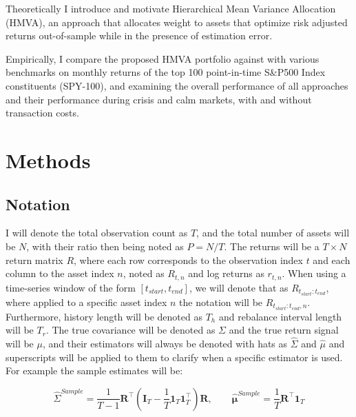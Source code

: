 \documentclass[12pt]{article}
\begin{document}
Theoretically I introduce and motivate Hierarchical Mean Variance Allocation (HMVA), an approach that allocates weight to assets that optimize risk adjusted returns out-of-sample while in the presence of estimation error.

Empirically, I compare the proposed HMVA portfolio against with various benchmarks on monthly returns of the top 100 point-in-time S\&P500 Index constituents (SPY-100), and examining the overall performance of all approaches and their performance during crisis and calm markets, with and without transaction costs.

\section{Methods}
\label{sec:meth}
\subsection{Notation}
I will denote the total observation count as $T$, and the total number of assets will be $N$, with their ratio then being noted as $P=N/T$. The returns will be a $T \times N$ return matrix $R$, where each row corresponds to the observation index $t$ and each column to the asset index $n$, noted as $R_{t,n}$ and log returns as $r_{t,n}$. When using a time-series window of the form $[t_{start}, t_{end}]$, we will denote that as $R_{t_{start}:t_{end}}$, where applied to a specific asset index $n$ the notation will be $R_{t_{start}:t_{end}, n}$. Furthermore, history length will be denoted as $T_h$ and rebalance interval length will be $T_r$. The true covariance will be denoted as $\Sigma$ and the true return signal will be $\mu$, and their estimators will always be denoted with hats as $\hat{\Sigma}$ and $\hat{\mu}$ and superscripts will be applied to them to clarify when a specific estimator is used. For example the sample estimates will be:

$$
\hat{\Sigma}^{Sample} = \frac{1}{T-1} \mathbf{R}^\top \left( \mathbf{I}_T - \frac{1}{T} \mathbf{1}_T \mathbf{1}_T^\top \right) \mathbf{R},
\quad \quad
\hat{\boldsymbol{\mu}}^{Sample}  = \frac{1}{T} \mathbf{R}^\top \mathbf{1}_T
$$
\end{document}
